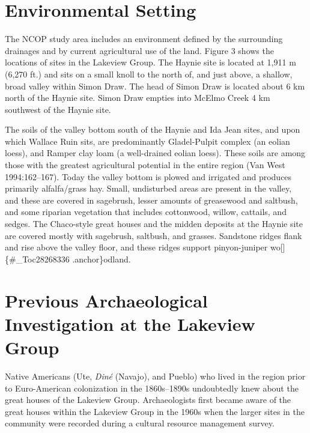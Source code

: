 \documentclass[
  12pt,
]{krantz}
\begin{document}
\hypertarget{environmental-setting}{%
\section{Environmental Setting}\label{environmental-setting}}

The NCOP study area includes an environment defined by the surrounding
drainages and by current agricultural use of the land. Figure 3 shows
the locations of sites in the Lakeview Group. The Haynie site is located
at 1,911 m (6,270 ft.) and sits on a small knoll to the north of, and
just above, a shallow, broad valley within Simon Draw. The head of Simon
Draw is located about 6 km north of the Haynie site. Simon Draw empties
into McElmo Creek 4 km southwest of the Haynie site.

The soils of the valley bottom south of the Haynie and Ida Jean sites,
and upon which Wallace Ruin sits, are predominantly Gladel-Pulpit
complex (an eolian loess), and Ramper clay loam (a well-drained eolian
loess). These soils are among those with the greatest agricultural
potential in the entire region (Van West 1994:162--167). Today the
valley bottom is plowed and irrigated and produces primarily
alfalfa/grass hay. Small, undisturbed areas are present in the valley,
and these are covered in sagebrush, lesser amounts of greasewood and
saltbush, and some riparian vegetation that includes cottonwood, willow,
cattails, and sedges. The Chaco-style great houses and the midden
deposits at the Haynie site are covered mostly with sagebrush, saltbush,
and grasses. Sandstone ridges flank and rise above the valley floor, and
these ridges support pinyon-juniper wo{[}{]}\{\#\_Toc28268336 .anchor\}odland.

\hypertarget{previous-archaeological-investigation-at-the-lakeview-group}{%
\section{Previous Archaeological Investigation at the Lakeview Group}\label{previous-archaeological-investigation-at-the-lakeview-group}}

Native Americans (Ute, \emph{Diné} (Navajo), and Pueblo) who lived in the
region prior to Euro-American colonization in the 1860s--1890s
undoubtedly knew about the great houses of the Lakeview Group.
Archaeologists first became aware of the great houses within the
Lakeview Group in the 1960s when the larger sites in the community were
recorded during a cultural resource management survey.
\end{document}
